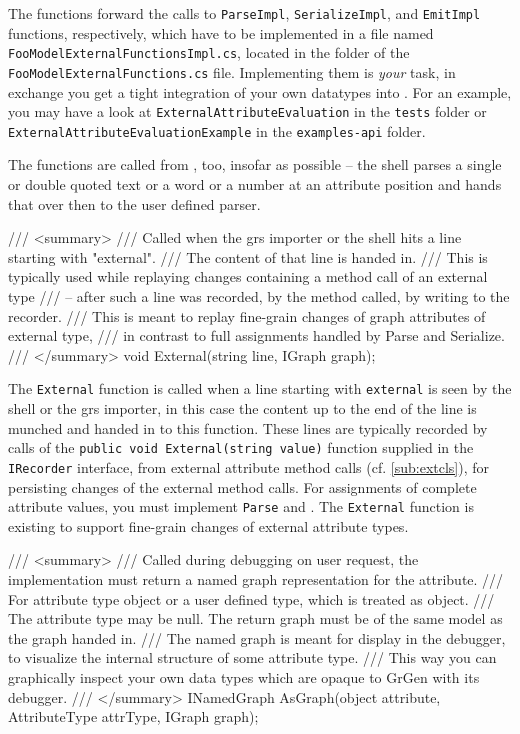 The functions forward the calls to \texttt{ParseImpl}, \texttt{SerializeImpl}, and \texttt{EmitImpl} functions, respectively, which have to be implemented in a file named \texttt{Foo\-Model\-External\-Functions\-Impl.cs}, located in the folder of the \texttt{Foo\-Model\-External\-Functions.cs} file.
Implementing them is \emph{your} task, in exchange you get a tight integration of your own datatypes into \GrG.
For an example, you may have a look at \texttt{External\-Attribute\-Evaluation} in the \texttt{tests} folder or \texttt{External\-Attribute\-Evaluation\-Example} in the \texttt{examples-api} folder.

The functions are called from \GrShell, too, insofar as possible -- the shell parses a single or double quoted text or a word or a number at an attribute position and hands that over then to the user defined parser.

\begin{csharplet}
/// <summary>
/// Called when the grs importer or the shell hits a line starting with "external".
/// The content of that line is handed in.
/// This is typically used while replaying changes containing a method call of an external type
/// -- after such a line was recorded, by the method called, by writing to the recorder.
/// This is meant to replay fine-grain changes of graph attributes of external type,
/// in contrast to full assignments handled by Parse and Serialize.
/// </summary>
void External(string line, IGraph graph);
\end{csharplet}

The \texttt{External} function is called when a line starting with \texttt{external} is seen by the shell or the grs importer, in this case the content up to the end of the line is munched and handed in to this function.
These lines are typically recorded by calls of the \texttt{public void External(string value)} function supplied in the \texttt{IRecorder} interface, from external attribute method calls (cf. \ref{sub:extcls}), for persisting changes of the external method calls.
For assignments of complete attribute values, you must implement \texttt{Parse} and .
The \texttt{External} function is existing to support fine-grain changes of external attribute types.

\begin{csharplet}
/// <summary>
/// Called during debugging on user request, the implementation must return a named graph representation for the attribute.
/// For attribute type object or a user defined type, which is treated as object.
/// The attribute type may be null. The return graph must be of the same model as the graph handed in.
/// The named graph is meant for display in the debugger, to visualize the internal structure of some attribute type.
/// This way you can graphically inspect your own data types which are opaque to GrGen with its debugger.
/// </summary>
INamedGraph AsGraph(object attribute, AttributeType attrType, IGraph graph);
\end{csharplet}

